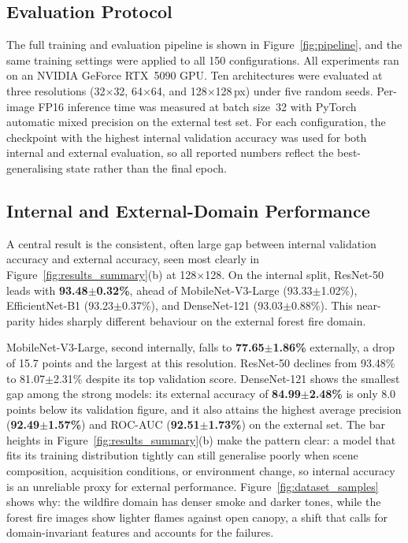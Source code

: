 \documentclass[conference]{IEEEtran}
\begin{document}
\subsection{Evaluation Protocol}

The full training and evaluation pipeline is shown in Figure~\ref{fig:pipeline}, and the same training settings were applied to all 150 configurations. All experiments ran on an NVIDIA GeForce RTX~5090 GPU. Ten architectures were evaluated at three resolutions (32$\times$32, 64$\times$64, and 128$\times$128\,px) under five random seeds. Per-image FP16 inference time was measured at batch size~32 with PyTorch automatic mixed precision on the external test set. For each configuration, the checkpoint with the highest internal validation accuracy was used for both internal and external evaluation, so all reported numbers reflect the best-generalising state rather than the final epoch.

\subsection{Internal and External-Domain Performance}

A central result is the consistent, often large gap between internal validation accuracy and external accuracy, seen most clearly in Figure~\ref{fig:results_summary}(b) at 128$\times$128. On the internal split, ResNet-50 leads with \textbf{93.48$\pm$0.32\%}, ahead of MobileNet-V3-Large (93.33$\pm$1.02\%), EfficientNet-B1 (93.23$\pm$0.37\%), and DenseNet-121 (93.03$\pm$0.88\%). This near-parity hides sharply different behaviour on the external forest fire domain.

MobileNet-V3-Large, second internally, falls to \textbf{77.65$\pm$1.86\%} externally, a drop of 15.7 points and the largest at this resolution. ResNet-50 declines from 93.48\% to 81.07$\pm$2.31\% despite its top validation score. DenseNet-121 shows the smallest gap among the strong models: its external accuracy of \textbf{84.99$\pm$2.48\%} is only 8.0 points below its validation figure, and it also attains the highest average precision (\textbf{92.49$\pm$1.57\%}) and ROC-AUC (\textbf{92.51$\pm$1.73\%}) on the external set. The bar heights in Figure~\ref{fig:results_summary}(b) make the pattern clear: a model that fits its training distribution tightly can still generalise poorly when scene composition, acquisition conditions, or environment change, so internal accuracy is an unreliable proxy for external performance. Figure~\ref{fig:dataset_samples} shows why: the wildfire domain has denser smoke and darker tones, while the forest fire images show lighter flames against open canopy, a shift that calls for domain-invariant features and accounts for the failures.
\end{document}
